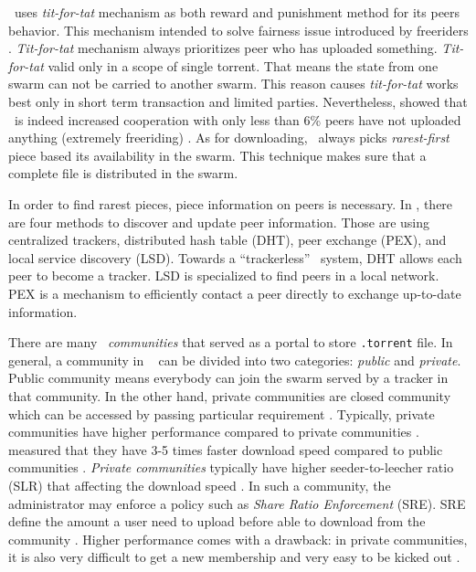 \bt~uses \textit{tit-for-tat} mechanism as both reward and punishment method for its peers behavior. This mechanism intended to solve fairness issue introduced by freeriders \cite{2003:bittorrent:cohen}. \textit{Tit-for-tat} mechanism always prioritizes peer who has uploaded something. \textit{Tit-for-tat} valid only in a scope of single torrent. That means the state from one swarm can not be carried to another swarm. This reason causes \textit{tit-for-tat} works best only in short term transaction and limited parties. Nevertheless, \citeauthor{2005:bittorrentcooperation:andrade} showed that \bt~is indeed increased cooperation with only less than 6\% peers have not uploaded anything (extremely freeriding) \cite{2005:bittorrentcooperation:andrade}. As for downloading, \bt~always picks \textit{rarest-first} piece based its availability in the swarm. This technique makes sure that a complete file is distributed in the swarm.

In order to find rarest pieces, piece information on peers is necessary. In \bt, there are four methods to discover and update peer information. Those are using centralized trackers, distributed hash table (DHT), peer exchange (PEX), and local service discovery (LSD). Towards a ``trackerless'' \bt~system, DHT allows each peer to become a tracker. LSD is specialized to find peers in a local network. PEX is a mechanism to efficiently contact a peer directly to exchange up-to-date information.

There are many \bt~\textit{communities} that served as a portal to store \texttt{.torrent} file. In general, a community in \bt~ can be divided into two categories: \textit{public} and \textit{private}. Public community means everybody can join the swarm served by a tracker in that community. In the other hand, private communities are closed community which can be accessed by passing particular requirement \cite{2010:pubpriv:meulpolder, 2014:sustainabilitytorrent:chen}. Typically, private communities have higher performance compared to private communities \cite{2010:pubpriv:meulpolder}. \citeauthor{2010:pubpriv:meulpolder} measured that they have 3-5 times faster download speed compared to public communities \cite{2010:pubpriv:meulpolder}. \textit{Private communities} typically have higher seeder-to-leecher ratio (SLR) that affecting the download speed \cite{2005:bittorrentcooperation:andrade}. In such a community, the administrator may enforce a policy such as \textit{Share Ratio Enforcement} (SRE). SRE define the amount a user need to upload before able to download from the community \cite{2012:economicbt:kash}. 
Higher performance comes with a drawback: in private communities, it is also very difficult to get a new membership and very easy to be kicked out \cite{2013:survivepriv:jia}.

